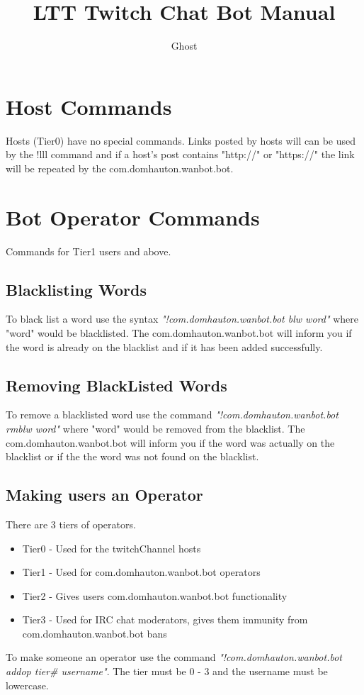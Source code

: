 \documentclass[10pt]{article}
\author{Ghost}
\title{LTT Twitch Chat Bot Manual}
\begin{document}
\maketitle
\tableofcontents
\section{Host Commands}
Hosts (Tier0) have no special commands. Links posted by hosts will can be used by the !lll command and if a host's post contains "http://" or "https://" the link will be repeated by the com.domhauton.wanbot.bot.
\section{Bot Operator Commands}
Commands for Tier1 users and above.
\subsection{Blacklisting Words}
To black list a word use the syntax \emph{"!com.domhauton.wanbot.bot blw word"} where "word" would be blacklisted. The com.domhauton.wanbot.bot will inform you if the word is already on the blacklist and if it has been added successfully.
\subsection{Removing BlackListed Words}
To remove a blacklisted word use the command \emph{"!com.domhauton.wanbot.bot rmblw word"} where "word" would be removed from the blacklist. The com.domhauton.wanbot.bot will inform you if the word was actually on the blacklist or if the the word was not found on the blacklist.
\subsection{Making users an Operator}
There are 3 tiers of operators.
\begin{itemize}
\item {Tier0 - Used for the twitchChannel hosts}
\item {Tier1 - Used for com.domhauton.wanbot.bot operators}
\item {Tier2 - Gives users com.domhauton.wanbot.bot functionality}
\item {Tier3 - Used for IRC chat moderators, gives them immunity from com.domhauton.wanbot.bot bans}
\end{itemize}
To make someone an operator use the command \emph{"!com.domhauton.wanbot.bot addop tier\# username"}. The tier must be 0 - 3 and the username must be lowercase.
\end{document}
